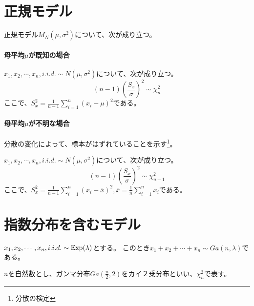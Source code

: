 \section{正規モデル}
正規モデル$M_N(\mu,\sigma^2)$について、次が成り立つ。
\paragraph{母平均$\mu$が既知の場合}
\begin{theo}\label{normal_sigma_chi2}
    $x_1,x_2,\cdots,x_n,i.i.d. \sim N(\mu,\sigma^2)$について、次が成り立つ。
    \begin{equation*}
     (n-1)\left(\frac{S_x}{\sigma} \right)^2 \sim \chi^2_{n}
    \end{equation*}
    ここで、$S^2_x=\frac{1}{n-1}\sum_{i=1}^n(x_i-\mu)^2$である。
\end{theo}

\paragraph{母平均$\mu$が不明な場合}
分散の変化によって、標本がはずれていることを示す\footnote{分散の検定}。
\begin{theo}\label{normal_sigma_chi2}
    $x_1,x_2,\cdots,x_n,i.i.d. \sim N(\mu,\sigma^2)$について、次が成り立つ。
    \begin{equation*}
        (n-1)\left(\frac{S_x}{\sigma} \right)^2 \sim \chi^2_{n-1}
    \end{equation*}
    ここで、$S^2_x=\frac{1}{n-1}\sum_{i=1}^n(x_i-\bar{x})^2,\bar{x}=\frac{1}{n}\sum_{i=1}^n x_i$である。
\end{theo}


\section{指数分布を含むモデル}

\begin{theo}
    $x_1,x_2,\cdots,x_n,i.i.d. \sim \rm{Exp}(\lambda)$とする。
    このとき$x_1+x_2+\cdots+x_n \sim Ga(n,\lambda)$である。
\end{theo}

$n$を自然数とし、ガンマ分布$Ga(\frac{n}{2},2)$をカイ２乗分布といい、$\chi ^2_n$で表す。

